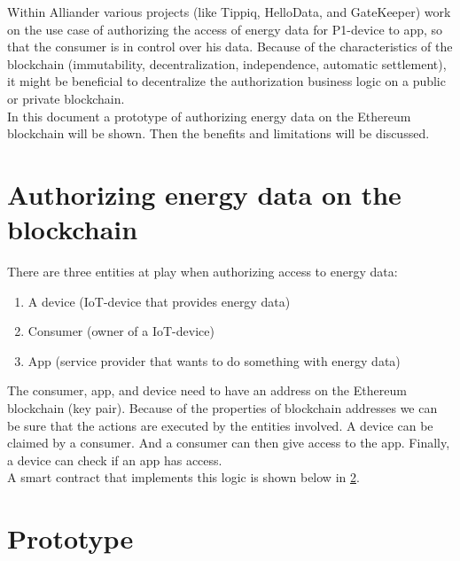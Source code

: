 \documentclass[paper=a4, fontsize=11pt]{scrartcl}
\numberwithin{equation}{section} %
\numberwithin{figure}{section}   %
\numberwithin{table}{section}    %
\begin{document}
Within Alliander various projects (like Tippiq, HelloData, and GateKeeper) work
on the use case of authorizing the access of energy data for P1-device to app,
so that the consumer is in control over his data. Because of the characteristics
of the blockchain (immutability, decentralization, independence, automatic
settlement), it might be beneficial to decentralize the authorization business
logic on a public or private blockchain.\\

In this document a prototype of authorizing energy data on the Ethereum
blockchain will be shown. Then the benefits and limitations will be discussed.\\

\section{Authorizing energy data on the blockchain}

There are three entities at play when authorizing access to energy data:

\begin{enumerate}
  \item A device (IoT-device that provides energy data)
  \item Consumer (owner of a IoT-device)
  \item App (service provider that wants to do something with energy data)
\end{enumerate}

The consumer, app, and device need to have an address on the Ethereum blockchain
(key pair). Because of the properties of blockchain addresses we can be sure
that the actions are executed by the entities involved. A device can be claimed
by a consumer. And a consumer can then give access to the app. Finally, a device
can check if an app has access.\\

A smart contract that implements this logic is shown below in \ref{prototype}.\\

\section{Prototype}
\label{prototype}

%

\end{document}
